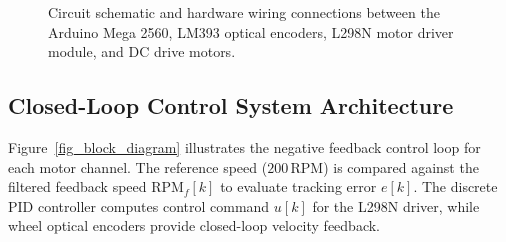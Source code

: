 \documentclass[11pt,a4paper]{article}
\begin{document}
\begin{figure}[H]
{%
}
\caption{Circuit schematic and hardware wiring connections between the Arduino Mega 2560, LM393 optical encoders, L298N motor driver module, and DC drive motors.}
\label{fig_wiring_diagram}
\end{figure}

\vspace{-0.2cm}
\subsection{Closed-Loop Control System Architecture}
Figure~\ref{fig_block_diagram} illustrates the negative feedback control loop for each motor channel. The reference speed ($200\,\text{RPM}$) is compared against the filtered feedback speed $\text{RPM}_f[k]$ to evaluate tracking error $e[k]$. The discrete PID controller computes control command $u[k]$ for the L298N driver, while wheel optical encoders provide closed-loop velocity feedback.
\end{document}
